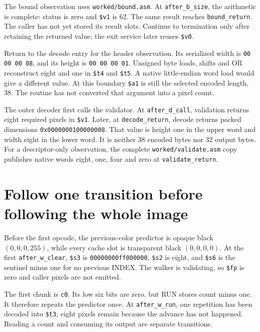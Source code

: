 The bound observation uses \texttt{worked/bound.asm}. At
\texttt{after\_b\_size}, the arithmetic is complete: status is zero and
\texttt{\$v1} is 62. The same result reaches \texttt{bound\_return}.
The caller has not yet stored its result slots. Continue to termination only
after retaining the returned value; the exit service later reuses \texttt{\$v0}.

Return to the decode entry for the header observation. Its serialized width is
\texttt{00 00 00 08}, and its height is \texttt{00 00 00 01}. Unsigned byte
loads, shifts and OR reconstruct eight and one in \texttt{\$t4} and
\texttt{\$t5}. A native little-endian word load would give a different value.
At this boundary \texttt{\$a1} is still the selected encoded length, 38.
The routine has not converted that argument into a pixel count.

The outer decoder first calls the validator. At \texttt{after\_d\_call},
validation returns eight required pixels in \texttt{\$v1}. Later, at
\texttt{decode\_return}, decode returns packed dimensions
\texttt{0x0000000100000008}. That value is height one in the upper word and
width eight in the lower word. It is neither 38 encoded bytes nor 32 output bytes.
For a descriptor-only observation, the complete \texttt{worked/validate.asm}
copy publishes native words eight, one, four and zero at \texttt{validate\_return}.

\section{Follow one transition before following the whole image}

Before the first opcode, the previous-color predictor is opaque black
$(0,0,0,255)$, while every cache slot is transparent black $(0,0,0,0)$.
At the first \texttt{after\_w\_clear}, \texttt{\$s3} is
\texttt{00000000ff000000}, \texttt{\$s2} is eight, and
\texttt{\$s6} is the sentinel minus one for no previous INDEX. The walker is
validating, so \texttt{\$fp} is zero and caller pixels are not emitted.

The first chunk is \texttt{c0}. Its low six bits are zero, but RUN stores
count minus one. It therefore repeats the predictor once. At
\texttt{after\_w\_run}, one repetition has been decoded into \texttt{\$t3};
eight pixels remain because the advance has not happened. Reading a count and
consuming its output are separate transitions.


